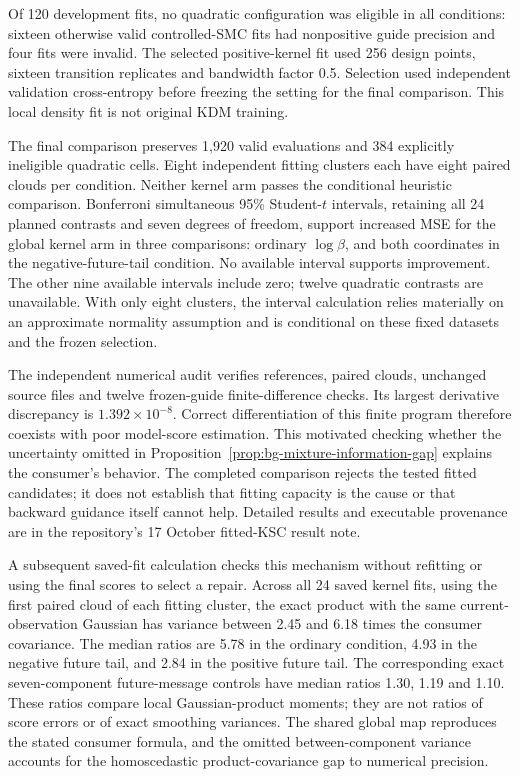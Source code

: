 Of 120 development fits, no quadratic configuration was eligible in all
conditions: sixteen otherwise valid controlled-SMC fits had nonpositive
guide precision and four fits were invalid. The selected positive-kernel
fit used 256 design points, sixteen transition replicates and bandwidth
factor 0.5. Selection used independent validation cross-entropy before
freezing the setting for the final comparison. This local density fit is
not original KDM training.

The final comparison preserves 1,920 valid evaluations and 384 explicitly
ineligible quadratic cells. Eight independent fitting clusters each have
eight paired clouds per condition. Neither kernel arm passes the conditional
heuristic comparison. Bonferroni simultaneous 95\% Student-$t$ intervals,
retaining all 24 planned contrasts and seven degrees of freedom, support
increased MSE for the global kernel arm in three comparisons: ordinary
$\log\beta$, and both coordinates in the negative-future-tail condition.
No available interval supports improvement. The other nine available
intervals include zero; twelve quadratic contrasts are unavailable. With
only eight clusters, the interval calculation relies materially on an
approximate normality assumption and is conditional on these fixed datasets
and the frozen selection.

The independent numerical audit verifies references, paired clouds, unchanged
source files and twelve frozen-guide finite-difference checks. Its largest
derivative discrepancy is $1.392\times10^{-8}$. Correct differentiation of
this finite program therefore coexists with poor model-score estimation.
This motivated checking whether the uncertainty omitted in
Proposition~\ref{prop:bg-mixture-information-gap} explains the consumer's
behavior. The completed comparison rejects the tested fitted candidates;
it does not establish that fitting capacity is the cause or that backward
guidance itself cannot help. Detailed results and executable provenance are
in the repository's 17 October fitted-KSC result note.

A subsequent saved-fit calculation checks this mechanism without refitting
or using the final scores to select a repair. Across all 24 saved kernel fits,
using the first paired cloud of each fitting cluster, the exact product with
the same current-observation Gaussian has variance between 2.45 and 6.18
times the consumer covariance. The median ratios are 5.78 in the ordinary
condition, 4.93 in the negative future tail, and 2.84 in the positive future
tail. The corresponding exact seven-component future-message controls have
median ratios 1.30, 1.19 and 1.10. These ratios compare local Gaussian-product
moments; they are not ratios of score errors or of exact smoothing variances.
The shared global map reproduces the stated consumer formula, and the
omitted between-component variance accounts for the homoscedastic
product-covariance gap to numerical precision.

